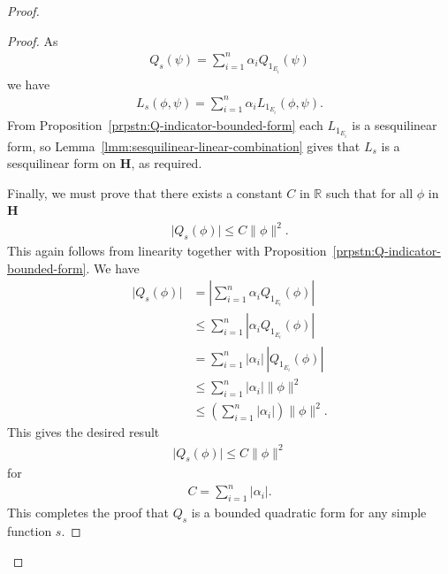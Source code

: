 \begin{proof}
\begin{proof}
As
\begin{align}
    Q_s(\psi) = \sum_{i = 1}^n \alpha_i  Q_{1_{E_i}}(\psi)
\end{align}
we have
\begin{align}
    L_s(\phi, \psi) = \sum_{i = 1}^n \alpha_i L_{1_{E_i}}(\phi, \psi).
\end{align}
From Proposition~\ref{prpstn:Q-indicator-bounded-form} each $L_{1_{E_i}}$ is a sesquilinear form, so Lemma~\ref{lmm:sesquilinear-linear-combination} gives that $L_s$ is a sesquilinear form on $\mathbf{H}$, as required.

Finally, we must prove that there exists a constant $C$ in $\mathbb{R}$ such that for all $\phi$ in $\mathbf{H}$
\begin{align}
    \lvert Q_s(\phi) \rvert \le C \|\phi\|^2.
\end{align}
This again follows from linearity together with Proposition~\ref{prpstn:Q-indicator-bounded-form}. We have
\begin{align}
    \lvert Q_s(\phi) \rvert &= \left\lvert \sum_{i = 1}^n \alpha_i Q_{1_{E_i}}(\phi) \right\rvert \\
                &\le \sum_{i = 1}^n \left\lvert \alpha_i Q_{1_{E_i}}(\phi) \right\rvert \\
                &= \sum_{i = 1}^n \left\lvert\alpha_i\right\rvert \, \left\lvert Q_{1_{E_i}}(\phi) \right\rvert \\
                &\le \sum_{i = 1}^n \left\lvert\alpha_i\right\rvert \|\phi\|^2 \\
                &\le \left( \sum_{i = 1}^n \left\lvert\alpha_i\right\rvert \right) \|\phi\|^2.
\end{align}
This gives the desired result
\begin{align}
    \lvert Q_s(\phi) \rvert \le C \|\phi\|^2
\end{align}
for
\begin{align}
    C = \sum_{i = 1}^n \left\lvert\alpha_i\right\rvert.
\end{align}
This completes the proof that $Q_s$ is a bounded quadratic form for any simple function $s$.
\end{proof}


\end{proof}

